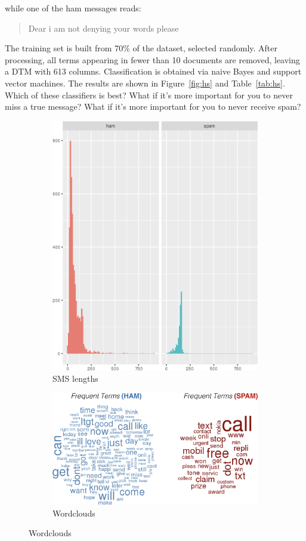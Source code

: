 while one of the ham messages reads:
\begin{quote}
Dear i am not denying your words please
\end{quote}
The training set is built from 70\% of the dataset, selected randomly. After processing, all terms appearing in fewer than 10 documents are removed, leaving a DTM with 613 columns. Classification is obtained via naive Bayes and support vector machines. The results are shown in Figure~\ref{fig:hs} and Table~\ref{tab:hs}. Which of these classifiers is best? What if it's more important for you to never miss a true message? What if it's more important for you to never receive spam?  
\begin{figure}[!t]
\centering
\begin{subfigure}[c]{0.24\textwidth}
\includegraphics[width=\textwidth]{images/DSML/TMHS1.png}\caption{\small SMS lengths}
\end{subfigure}
\begin{subfigure}[c]{0.48\textwidth}
\includegraphics[width=\textwidth]{images/DSML/TMHS2.png}\caption{\small Wordclouds}

\end{subfigure}
\end{figure}
